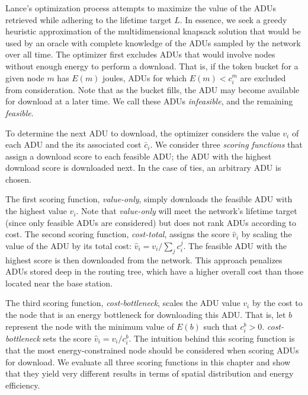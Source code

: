 Lance's optimization process attempts to maximize the value of the ADUs
retrieved while adhering to the lifetime target $L$. In essence, we seek a
greedy heuristic approximation of the multidimensional knapsack solution that
would be used by an oracle with complete knowledge of the ADUs sampled by the
network over all time. The optimizer first excludes ADUs that would involve
nodes without enough energy to perform a download. That is, if the token
bucket for a given node $m$ has $E(m)$ joules, ADUs for which $E(m) < c_i^m$
are excluded from consideration. Note that as the bucket fills, the ADU may
become available for download at a later time. We call these ADUs
\textit{infeasible}, and the remaining \textit{feasible}.

To determine the next ADU to download, the optimizer considers the value
$v_i$ of each ADU and the its associated cost $\bar{c}_i$. We consider three
\textit{scoring functions} that assign a download score to each feasible ADU;
the ADU with the highest download score is downloaded next. In the case of
ties, an arbitrary ADU is chosen.

The first scoring function, \textit{value-only}, simply downloads the
feasible ADU with the highest value $v_i$. Note that \textit{value-only} will
meet the network's lifetime target (since only feasible ADUs are considered)
but does not rank ADUs according to cost. The second scoring function,
\textit{cost-total}, assigns the score $\hat{v}_i$ by scaling the value of
the ADU by its total cost: $\hat{v}_i = v_i / \sum_j c_i^j$. The feasible ADU
with the highest score is then downloaded from the network. This approach
penalizes ADUs stored deep in the routing tree, which have a higher overall
cost than those located near the base station. 

The third scoring function, \textit{cost-bottleneck}, scales the ADU value
$v_i$ by the cost to the node that is an energy bottleneck for downloading
this ADU. That is, let $b$ represent the node with the minimum value of
$E(b)$ such that $c_i^b > 0$. \textit{cost-bottleneck} sets the score
$\hat{v}_i = v_i / c_i^b$. The intuition behind this scoring function is that
the most energy-constrained node should be considered when scoring ADUs for
download. We evaluate all three scoring functions in this chapter and show that
they yield very different results in terms of spatial distribution and energy
efficiency.
